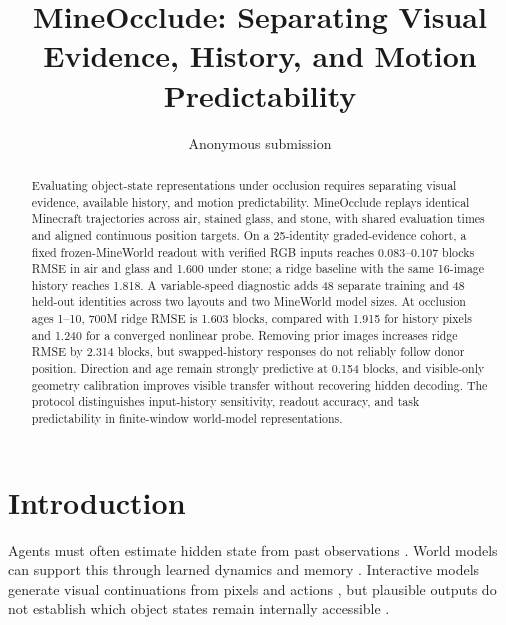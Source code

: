\documentclass{article}
\title{MineOcclude: Separating Visual Evidence, History, and Motion Predictability}
\author{Anonymous submission}
\begin{document}
\maketitle

\begin{abstract}
Evaluating object-state representations under occlusion requires separating visual evidence, available history, and motion predictability. MineOcclude replays identical Minecraft trajectories across air, stained glass, and stone, with shared evaluation times and aligned continuous position targets. On a 25-identity graded-evidence cohort, a fixed frozen-MineWorld readout with verified RGB inputs reaches 0.083--0.107 blocks RMSE in air and glass and 1.600 under stone; a ridge baseline with the same 16-image history reaches 1.818. A variable-speed diagnostic adds 48 separate training and 48 held-out identities across two layouts and two MineWorld model sizes. At occlusion ages 1--10, 700M ridge RMSE is 1.603 blocks, compared with 1.915 for history pixels and 1.240 for a converged nonlinear probe. Removing prior images increases ridge RMSE by 2.314 blocks, but swapped-history responses do not reliably follow donor position. Direction and age remain strongly predictive at 0.154 blocks, and visible-only geometry calibration improves visible transfer without recovering hidden decoding. The protocol distinguishes input-history sensitivity, readout accuracy, and task predictability in finite-window world-model representations.
\end{abstract}

\section{Introduction}

Agents must often estimate hidden state from past observations \citep{kaelbling1998planning,hafner2019planet,zheng2026memworld}. World models can support this through learned dynamics and memory \citep{ha2018worldmodels,hafner2020dreamer,laird2025memory}. Interactive models generate visual continuations from pixels and actions \citep{micheli2023transformers,alonso2024diffusion,bruce2024genie,decart2024oasis,guo2025mineworld}, but plausible outputs do not establish which object states remain internally accessible \citep{motamed2025generative,esmati2026invisible}.
\end{document}
